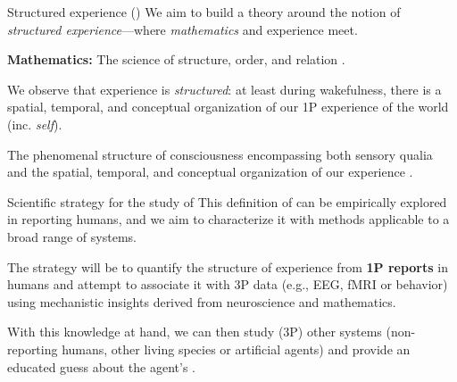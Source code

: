 \begin{frame}[label=intro2]{Structured experience (\SEP)}
 We aim to build a theory around the notion of 
{\em structured experience}---where {\em mathematics} and experience meet.  \vfill

{\bf Mathematics:}  The science of structure, order, and relation  \cite{gray_2010}.  \vfill

We observe that  experience is {\em structured}: at least during wakefulness, there is a spatial, temporal, and conceptual organization of our 1P experience of the world (inc. {\em self}). \vfill

	\begin{definition}
The phenomenal structure of consciousness  encompassing both sensory qualia and the spatial, temporal, and conceptual organization of our experience  \citep{VanGulick:2016aa}. 
	\end{definition}

	

\end{frame}

\begin{frame}[label=intro3]{Scientific strategy for the study of \SEP}
This definition of \SEP can be empirically explored in reporting humans, and  we   aim to characterize it with methods  applicable to a broad range of systems.  \vfill

  The  strategy will be  to quantify the structure of experience from {\bf 1P reports}  in humans and attempt to associate it with 3P data (e.g., EEG, fMRI or behavior) using mechanistic insights derived from  neuroscience and mathematics.  \vfill
  
  With this knowledge at hand, we can then study (3P) other systems (non-reporting humans, other living species or artificial agents) %
  and provide an educated guess about the agent's \SEP.

\end{frame}

